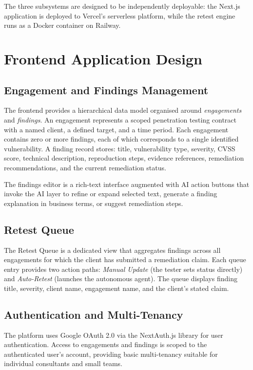 The three subsystems are designed to be independently deployable: the Next.js application is deployed to Vercel's serverless platform, while the retest engine runs as a Docker container on Railway.

\section{Frontend Application Design}

\subsection{Engagement and Findings Management}

The frontend provides a hierarchical data model organised around \textit{engagements} and \textit{findings}. An engagement represents a scoped penetration testing contract with a named client, a defined target, and a time period. Each engagement contains zero or more findings, each of which corresponds to a single identified vulnerability. A finding record stores: title, vulnerability type, severity, CVSS score, technical description, reproduction steps, evidence references, remediation recommendations, and the current remediation status.

The findings editor is a rich-text interface augmented with AI action buttons that invoke the AI layer to refine or expand selected text, generate a finding explanation in business terms, or suggest remediation steps.

\subsection{Retest Queue}

The Retest Queue is a dedicated view that aggregates findings across all engagements for which the client has submitted a remediation claim. Each queue entry provides two action paths: \textit{Manual Update} (the tester sets status directly) and \textit{Auto-Retest} (launches the autonomous agent). The queue displays finding title, severity, client name, engagement name, and the client's stated claim.

\subsection{Authentication and Multi-Tenancy}

The platform uses Google OAuth 2.0 via the NextAuth.js library for user authentication. Access to engagements and findings is scoped to the authenticated user's account, providing basic multi-tenancy suitable for individual consultants and small teams.

